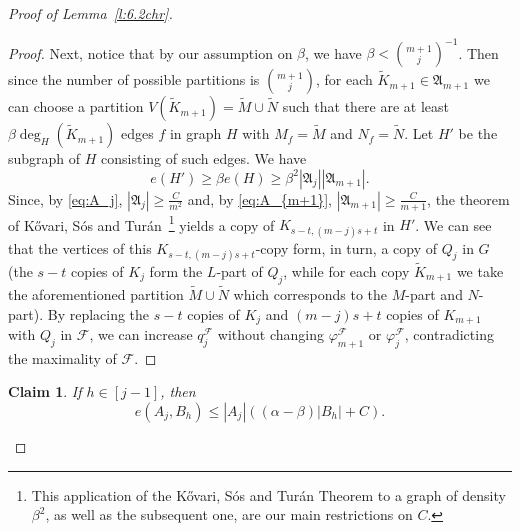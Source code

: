 \documentclass[reqno, 12pt]{amsart}
\numberwithin{equation}{section}
\numberwithin{figure}{section}
\theoremstyle{plain}
\newtheorem{claim}[thm]{Claim}
\theoremstyle{definition}
\let\phi=\varphi
\def\cF{{\mathcal F}}
\def\fA{\mathfrak{A}}
\begin{document}
\begin{proof}[Proof of Lemma~\ref{l:6.2chr}]
\begin{proof}
            Next, notice that by our assumption on $\beta$, we have $\beta<\binom{m+1}{j}^{-1}$. Then since the number of possible partitions is $\binom{m+1}{j}$, for each $\tilde K_{m+1}\in\fA_{m+1}$ we can choose a partition $V(\tilde K_{m+1})=\tilde M \cup \tilde N$ such that there are at least $\beta \deg_H(\tilde K_{m+1})$ edges $f$ in graph $H$ with $M_f=\tilde M$ and $N_f=\tilde N$. Let $H'$ be the subgraph of $H$ consisting of such edges. We have $$e(H')\geq \beta e(H)\geq \beta^2 |\fA_j||\fA_{m+1}|.$$
            Since, by \eqref{eq:A_j}, $|\fA_j|\geq \frac{C}{m^2}$ and, by \eqref{eq:A_{m+1}},  $|\fA_{m+1}|\geq \frac{C}{m+1}$, the theorem of K\H{o}vari, S\'os and Tur\'an~\cite{kst54}\footnote{This application of the K\H{o}vari, S\'os and Tur\'an Theorem to a graph of density $\beta^2$, as well as the subsequent one, are our main restrictions on $C$.} yields a copy of $K_{s-t,(m-j)s+t}$ in $H'$. We can see that the vertices of this $K_{s-t,(m-j)s+t}$-copy form, in turn, a copy of $Q_j$ in $G$ (the $s-t$ copies of $K_j$ form the $L$-part of $Q_j$, while for each copy $\tilde K_{m+1}$ we take the aforementioned partition $\tilde M \cup\tilde N$ which corresponds to the $M$-part and $N$-part). By replacing the $s-t$ copies of $K_j$ and $(m-j)s+t$ copies of $K_{m+1}$ with $Q_j$ in $\cF$, we can increase $q_j^\cF$ without changing $\phi_{m+1}^\cF$ or $\phi_j^\cF$, contradicting the maximality of $\cF$. 
        \end{proof}

        \begin{claim}
            \label{c:p-B-edges}
            If $h\in[j-1]$, then 
            $$e(A_j,B_h)\leq |A_j|((\alpha-\beta)|B_h|+C).$$
        \end{claim}
        

\end{proof}
\end{document}
